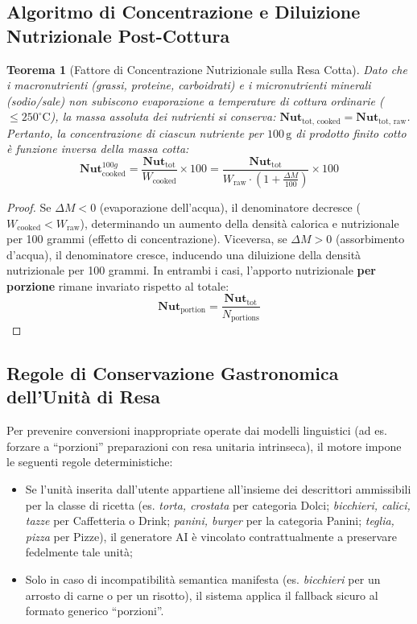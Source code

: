 \documentclass[11pt,a4paper,titlepage]{article}
\newtheorem{theorem}{Teorema}
\begin{document}
\subsection{Algoritmo di Concentrazione e Diluizione Nutrizionale Post-Cottura}
\begin{theorem}[Fattore di Concentrazione Nutrizionale sulla Resa Cotta]
Dato che i macronutrienti (grassi, proteine, carboidrati) e i micronutrienti minerali (sodio/sale) non subiscono evaporazione a temperature di cottura ordinarie ($\le 250^\circ\text{C}$), la massa assoluta dei nutrienti si conserva: $\mathbf{Nut}_{\text{tot, cooked}} = \mathbf{Nut}_{\text{tot, raw}}$.
Pertanto, la concentrazione di ciascun nutriente per $100\,\text{g}$ di prodotto finito cotto \`e funzione inversa della massa cotta:
$$\mathbf{Nut}_{\text{cooked}}^{100g} = \frac{\mathbf{Nut}_{\text{tot}}}{W_{\text{cooked}}} \times 100 = \frac{\mathbf{Nut}_{\text{tot}}}{W_{\text{raw}} \cdot \left(1 + \frac{\Delta M}{100}\right)} \times 100$$
\end{theorem}
\begin{proof}
Se $\Delta M < 0$ (evaporazione dell'acqua), il denominatore decresce ($W_{\text{cooked}} < W_{\text{raw}}$), determinando un aumento della densit\`a calorica e nutrizionale per 100 grammi (effetto di concentrazione). Viceversa, se $\Delta M > 0$ (assorbimento d'acqua), il denominatore cresce, inducendo una diluizione della densit\`a nutrizionale per 100 grammi. In entrambi i casi, l'apporto nutrizionale \textbf{per porzione} rimane invariato rispetto al totale:
$$\mathbf{Nut}_{\text{portion}} = \frac{\mathbf{Nut}_{\text{tot}}}{N_{\text{portions}}}$$
\end{proof}

\subsection{Regole di Conservazione Gastronomica dell'Unit\`a di Resa}
Per prevenire conversioni inappropriate operate dai modelli linguistici (ad es. forzare a ``porzioni'' preparazioni con resa unitaria intrinseca), il motore impone le seguenti regole deterministiche:
\begin{itemize}[leftmargin=*]
    \item Se l'unit\`a inserita dall'utente appartiene all'insieme dei descrittori ammissibili per la classe di ricetta (es. \textit{torta, crostata} per categoria Dolci; \textit{bicchieri, calici, tazze} per Caffetteria o Drink; \textit{panini, burger} per la categoria Panini; \textit{teglia, pizza} per Pizze), il generatore AI \`e vincolato contrattualmente a preservare fedelmente tale unit\`a;
    \item Solo in caso di incompatibilit\`a semantica manifesta (es. \textit{bicchieri} per un arrosto di carne o per un risotto), il sistema applica il fallback sicuro al formato generico ``porzioni''.
\end{itemize}
\end{document}
